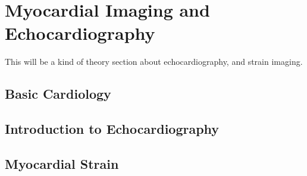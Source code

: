\chapter{Myocardial Imaging and Echocardiography} \label{chap:strain}

This will be a kind of theory section about echocardiography, and strain imaging. \bigskip

\section{Basic Cardiology}

\section{Introduction to Echocardiography}

\section{Myocardial Strain}
